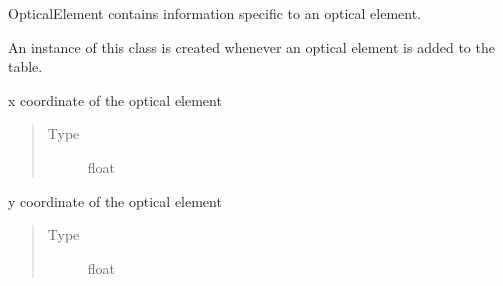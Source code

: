\documentclass[letterpaper,10pt,english]{sphinxmanual}
\begin{document}

\begin{fulllineitems}
\label{\detokenize{index:pyopticaltable.OpticalElement}}
\sphinxAtStartPar
OpticalElement contains information specific to an optical element.

\sphinxAtStartPar
An instance of this class is created whenever an optical element is added
to the table.

\begin{fulllineitems}
\label{\detokenize{index:pyopticaltable.OpticalElement.x}}
\sphinxAtStartPar
x coordinate of the optical element
\begin{quote}\begin{description}
\item[{Type}] \leavevmode
\sphinxAtStartPar
float

\end{description}\end{quote}

\end{fulllineitems}


\begin{fulllineitems}
\label{\detokenize{index:pyopticaltable.OpticalElement.y}}
\sphinxAtStartPar
y coordinate of the optical element
\begin{quote}\begin{description}
\item[{Type}] \leavevmode
\sphinxAtStartPar
float

\end{description}\end{quote}

\end{fulllineitems}


\end{fulllineitems}
\end{document}
